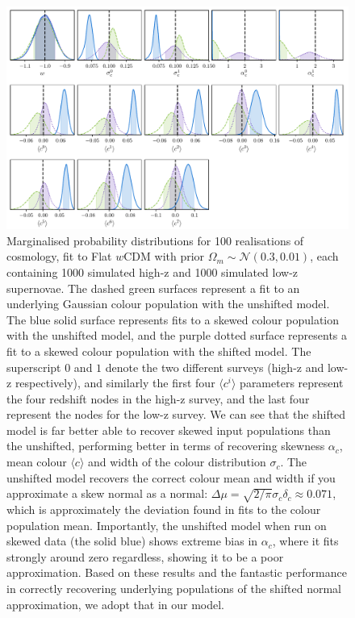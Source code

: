 \documentclass[a4paper,fleqn,usenatbib]{mnras}
\begin{document}
\begin{figure}
	\begin{center}
		\includegraphics[width=\textwidth]{simple_w_shift_dist_0.pdf}
	\end{center}
	\caption{Marginalised probability distributions for 100 realisations of cosmology, fit to Flat $w$CDM with prior $\Omega_m \sim \mathcal{N}(0.3, 0.01)$, each containing 1000 simulated high-z and 1000 simulated low-z supernovae. The dashed green surfaces represent a fit to an underlying Gaussian colour population with the unshifted model. The blue solid surface represents fits to a skewed colour population with the unshifted model, and the purple dotted surface represents a fit to a skewed colour population with the shifted model. The superscript $0$ and $1$ denote the two different surveys (high-z and low-z respectively), and similarly the first four $\langle c^i \rangle$ parameters represent the four redshift nodes in the high-z survey, and the last four represent the nodes for the low-z survey. We can see that the shifted model is far better able to recover skewed input populations than the unshifted, performing better in terms of recovering skewness $\alpha_c$, mean colour $\langle c \rangle$ and width of the colour distribution $\sigma_c$. The unshifted model recovers the correct colour mean and width if you approximate a skew normal as a normal: $\Delta\mu = \sqrt{2/\pi}\sigma_c\delta_c \approx 0.071$, which is approximately the deviation found in fits to the colour population mean. Importantly, the unshifted model when run on skewed data (the solid blue) shows extreme bias in $\alpha_c$, where it fits strongly around zero regardless, showing it to be a poor approximation. Based on these results and the fantastic performance in correctly recovering underlying populations of the shifted normal approximation, we adopt that in our model.}
	\label{fig:simple_w_super}
\end{figure}
\end{document}

